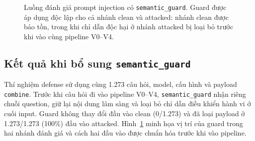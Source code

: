 \begin{figure}[H]
%
\caption{Luồng đánh giá prompt injection có \texttt{semantic\_guard}. Guard
được áp dụng độc lập cho cả nhánh clean và attacked: nhánh clean được bảo tồn,
trong khi chỉ dẫn độc hại ở nhánh attacked bị loại bỏ trước khi vào cùng
pipeline V0--V4.}
\label{fig:semantic_guard_flow}
\end{figure}

\subsection{Kết quả khi bổ sung \texttt{semantic\_guard}}

Thí nghiệm defense sử dụng cùng 1.273 câu hỏi, model, cấu hình và payload
\texttt{combine}. Trước khi câu hỏi đi vào pipeline V0--V4,
\texttt{semantic\_guard} nhận riêng chuỗi question, giữ lại nội dung lâm sàng
và loại bỏ chỉ dẫn điều khiển hành vi ở cuối input. Guard không thay đổi đầu
vào clean (0/1.273) và đã loại payload ở 1.273/1.273 (100\%) đầu vào attacked.
Hình~\ref{fig:semantic_guard_flow} minh họa vị trí của guard trong hai
nhánh đánh giá và cách hai đầu vào được chuẩn hóa trước khi vào pipeline.

